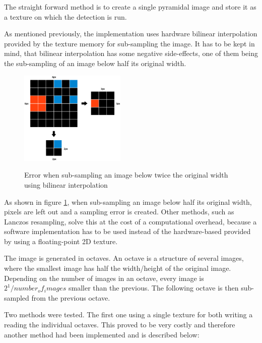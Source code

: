 The straight forward method is to create a single pyramidal image and store it as a texture on which the detection is run.

As mentioned previously, the implementation uses hardware bilinear interpolation provided by the texture memory for sub-sampling the image. It has to be kept in mind, that bilinear interpolation has some negative side-effects, one of them being the sub-sampling of an image below half its original width.

\begin{center}
\begin{figure}[ht]
	\centering\includegraphics[width=0.45\textwidth]{fig/bilinear_error.eps}\label{fig:bilinear-error}
	\caption{Error when sub-sampling an image below twice the original width using bilinear interpolation}
\end{figure}
\end{center}

As shown in figure \ref{fig:bilinear-error}, when sub-sampling an image below half its original width, pixels are left out and a sampling error is created. Other methods, such as Lanczos resampling, solve this at the cost of a computational overhead, because a software implementation has to be used instead of the hardware-based provided by using a floating-point 2D texture.

The image is generated in octaves. An octave is a structure of several images, where the smallest image has half the width/height of the original image. Depending on the number of images in an octave, every image is $2^1/number_of_images$ smaller than the previous. The following octave is then sub-sampled from the previous octave.

Two methods were tested. The first one using a single texture for both writing a reading the individual octaves. This proved to be very costly and therefore another method had been implemented and is described below:

